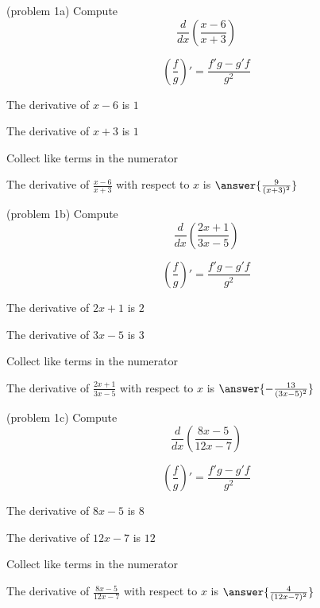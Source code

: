 \documentclass[handout]{ximera}
\begin{document}
\begin{problem}(problem 1a)
  Compute
  \[
  \frac{d}{dx} \left(\frac{x-6}{x+3}\right)
  \]
  
    \begin{hint}
      \[\left(\frac{f}{g}\right)' = \frac{f'g-g'f}{g^2}\]
    \end{hint}
    \begin{hint}
      The derivative of $x-6$ is $1$
    \end{hint}
    \begin{hint}
      The derivative of $x+3$ is $1$
    \end{hint}
    \begin{hint}
      Collect like terms in the numerator
    \end{hint}
		The derivative of $\frac{x-6}{x+3}$ with respect to $x$ is
		 $\answer{\frac{9}{(x+3)^2}}$
		
\end{problem}


\begin{problem}(problem 1b)
  Compute
  \[
  \frac{d}{dx} \left(\frac{2x+1}{3x-5}\right)
  \]
  
    \begin{hint}
      \[\left(\frac{f}{g}\right)' = \frac{f'g-g'f}{g^2}\]
    \end{hint}
    \begin{hint}
      The derivative of $2x+1$ is $2$
    \end{hint}
    \begin{hint}
      The derivative of $3x-5$ is $3$
    \end{hint}
    \begin{hint}
      Collect like terms in the numerator
    \end{hint}
		The derivative of $\frac{2x+1}{3x-5}$ with respect to $x$ is
		 $\answer{-\frac{13}{(3x-5)^2}}$
		
\end{problem}


\begin{problem}(problem 1c)
  Compute
  \[
  \frac{d}{dx} \left(\frac{8x-5}{12x - 7}\right)
  \]
  
    \begin{hint}
      \[\left(\frac{f}{g}\right)' = \frac{f'g-g'f}{g^2}\]
    \end{hint}
    \begin{hint}
      The derivative of $8x-5$ is $8$
    \end{hint}
    \begin{hint}
      The derivative of $12x-7$ is $12$
    \end{hint}
    \begin{hint}
      Collect like terms in the numerator
    \end{hint}
		The derivative of $\frac{8x-5}{12x-7}$ with respect to $x$ is
		 $\answer{\frac{4}{(12x-7)^2}}$
		
\end{problem}
\end{document}
